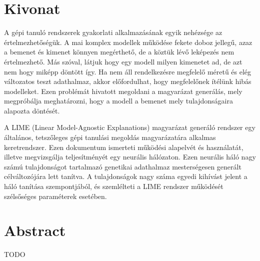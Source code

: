 \setcounter{page}{1}

\selecthungarian

\chapter*{Kivonat}

A gépi tanuló rendszerek gyakorlati alkalmazásának egyik nehézsége az értelmezhetőségük. A mai komplex modellek működése fekete doboz jellegű, azaz a bemenet és kimenet könnyen megérthető, de a köztük lévő leképezés nem értelmezhető. Más szóval, látjuk hogy egy modell milyen kimenetet ad, de azt nem hogy miképp döntött így. Ha nem áll rendelkezésre megfelelő méretű és elég változatos teszt adathalmaz, akkor előfordulhat, hogy megfelelőnek ítélünk hibás modelleket. Ezen problémát hivatott megoldani a magyarázat generálás, mely megpróbálja meghatározni, hogy a modell a bemenet mely tulajdonságaira alapozta döntését.
	 
A LIME (Linear Model-Agnostic Explanations) magyarázat generáló rendszer egy általános, tetszőleges gépi tanulási megoldás magyarázatára alkalmas keretrendszer. Ezen dokumentum ismerteti működési alapelvét és használatát, illetve megvizsgálja teljesítményét egy neurális hálózaton. Ezen neurális háló nagy számú tulajdonságot tartalmazó genetikai adathalmaz mesterségesen generált célváltozójára lett tanítva. A tulajdonságok nagy száma egyedi kihívást jelent a háló tanítása szempontjából, és szemlélteti a LIME rendszer működését szélsőséges paraméterek esetében. 


\vfill
\selectenglish


\chapter*{Abstract}

TODO


\vfill
\selectthesislanguage

\setcounter{romanPage}{\value{page}}
